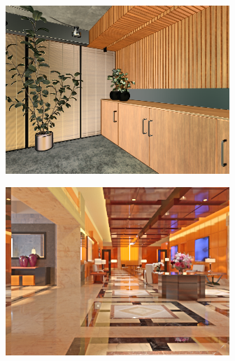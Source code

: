 \begin{figure}[H]
\begin{subfigure}{0.32\linewidth}
    \end{subfigure}
    \begin{subfigure}{0.32\linewidth}
        \includegraphics[width=\linewidth]{praca/images/AI53_020_Cam09.direct_ours.png}
    \end{subfigure}
    \begin{subfigure}{0.32\linewidth}
        \includegraphics[width=\linewidth]{praca/images/AI44_010_Cam01.png}
    \end{subfigure}
    \begin{subfigure}{0.32\linewidth}

\end{subfigure}
\end{figure}
